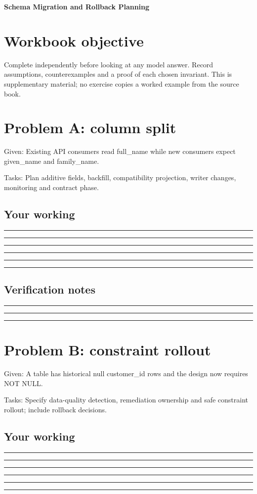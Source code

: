 \documentclass[11pt,letterpaper]{article}
\newcommand{\ResponseLine}{\par\vspace{1.05em}\noindent\rule{\linewidth}{0.4pt}\par}
\newcommand{\ResponseArea}{\ResponseLine\ResponseLine\ResponseLine}
\begin{document}
\begin{center}
{\LARGE\bfseries\color{navy} Schema Migration and Rollback Planning}\par
\vspace{0.25em}{\large Guided workbook | conceptual and operational analysis}\par
{}
\end{center}
\vspace{0.8em}
\section{Workbook objective}
Complete independently before looking at any model answer. Record assumptions, counterexamples and a proof of each chosen invariant. This is supplementary material; no exercise copies a worked example from the source book.


\section{Problem A: column split}
Given: Existing API consumers read full\_name while new consumers expect given\_name and family\_name.

Tasks: Plan additive fields, backfill, compatibility projection, writer changes, monitoring and contract phase.

\subsection{Your working}
\ResponseArea\ResponseArea
\subsection{Verification notes}
\ResponseArea

\section{Problem B: constraint rollout}
Given: A table has historical null customer\_id rows and the design now requires NOT NULL.

Tasks: Specify data-quality detection, remediation ownership and safe constraint rollout; include rollback decisions.

\subsection{Your working}
\ResponseArea\ResponseArea
\end{document}
